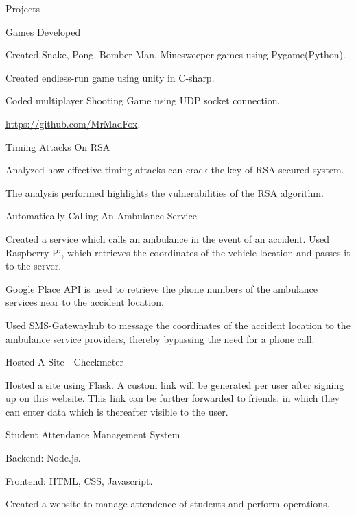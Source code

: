 \documentclass{resume} %
\begin{document}
\begin{rSection}{Projects}

\begin{rSubsection}{ Games Developed}{}{}

\item Created Snake, Pong, Bomber Man, Minesweeper games using Pygame(Python).
\item Created endless-run game using unity in C-sharp.
\item Coded multiplayer Shooting Game using UDP socket connection.
\item  \url{https://github.com/MrMadFox}.

\end{rSubsection}

\begin{rSubsection}{ Timing Attacks On RSA}{}{}

\item Analyzed how effective timing attacks can crack the key of RSA secured system.
\item The analysis performed highlights the vulnerabilities of the RSA algorithm.

\end{rSubsection}


\begin{rSubsection}{ Automatically Calling An Ambulance Service}{}{}

\item Created a service which calls an ambulance in the event of an accident. Used Raspberry Pi, which retrieves the coordinates of the vehicle location and passes it to the server.
\item Google Place API is used to retrieve the phone numbers of the ambulance services near to the accident location.
\item Used SMS-Gatewayhub to message the coordinates of the accident location to the ambulance service providers, thereby bypassing the need for a phone call.

\end{rSubsection}


\begin{rSubsection}{ Hosted A Site - Checkmeter}{}{}

\item Hosted a site using Flask. A custom link will be generated per user after signing up on this website. This link can be further forwarded to friends, in which they can enter data which is thereafter visible to the user.

\end{rSubsection}

\begin{rSubsection}{ Student Attendance Management System}{}{}

    \item Backend: Node.js.
    \item Frontend: HTML, CSS, Javascript.
    \item Created a website to manage attendence of students and perform operations.

\end{rSubsection}

\end{rSection}
\end{document}
